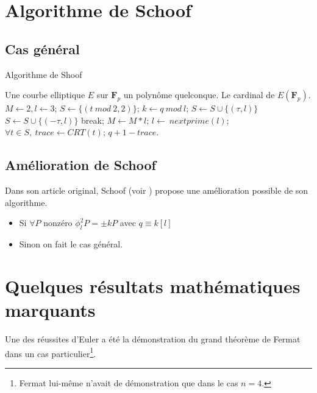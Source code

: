 \documentclass[fleqn,leqno]{article}%
\theoremstyle{plain}
\theoremstyle{definition}
\theoremstyle{remark}
\numberwithin{equation}{section}
\begin{document}
\section{Algorithme de Schoof}

\subsection{Cas général}

\begin{algorithm}
\caption{Algorithme de Shoof}
\label{schoof}
\begin{algorithmic} 
\REQUIRE Une courbe elliptique $E$ sur $\mathbf{F}_{p}$ un polynôme quelconque.
\ENSURE Le cardinal de $E(\mathbf{F}_{p})$.
\STATE $M\leftarrow 2, l\leftarrow 3$;
\STATE $S\leftarrow \{(t\ mod\ 2, 2)\}$; 
	\STATE $k\leftarrow q\ mod\ l$;	
			\STATE $S\leftarrow S\cup \{(\tau, l)\}$ \OR $S\leftarrow S\cup \{(-\tau, l)\}$ 
			\STATE break;
		\ENDIF
	\ENDFOR
	\STATE $M\leftarrow M*l$;
	\STATE $l\leftarrow\ nextprime(l)$; 	
\ENDWHILE
\STATE $\forall t\in S,\ trace\leftarrow CRT(t)$; 
\RETURN $q + 1 - trace$.
\end{algorithmic}
\end{algorithm}

\subsection{Amélioration de Schoof}

Dans son article original, Schoof (voir \cite{ref1}) propose une amélioration possible de son algorithme.
\begin{itemize}
\item Si $\forall P$ nonzéro $\phi_{l}^{2}P = \pm kP$ avec $q\equiv k[l]$ 
\item Sinon on fait le cas général.
\end{itemize}




\section{Quelques résultats mathématiques marquants}

Une des réussites d'Euler a été la démonstration du grand théorème de Fermat dans un cas particulier\footnote{Fermat lui-même n'avait de démonstration que dans le cas $n=4$.}.
\end{document}
